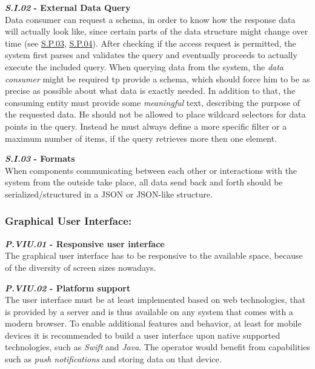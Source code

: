 \documentclass[12pt,english,a4paper,titlepage,cleardoublepage=empty,dottedtoc]{report}
\begin{document}
\textbf{\emph{\protect\hypertarget{si02}{}{S.I.02}} - External Data
Query}\\
Data consumer can request a schema, in order to know how the response
data will actually look like, since certain parts of the data structure
might change over time (see \protect\hyperlink{sp03}{S.P.03},
\protect\hyperlink{sp04}{S.P.04}). After checking if the access request
is permitted, the system first parses and validates the query and
eventually proceeds to actually execute the included query. When
querying data from the system, the \emph{data consumer} might be
required tp provide a schema, which should force him to be as precise as
possible about what data is exactly needed. In addition to that, the
consuming entity must provide some \emph{meaningful} text, describing
the purpose of the requested data. He should not be allowed to place
wildcard selectors for data points in the query. Instead he must always
define a more specific filter or a maximum number of items, if the query
retrieves more then one element.

\textbf{\emph{\protect\hypertarget{si03}{}{S.I.03}} - Formats}\\
When components communicating between each other or interactions with
the system from the outside take place, all data send back and forth
should be serialized/structured in a JSON or JSON-like structure.

\subsubsection{Graphical User
Interface:}\label{graphical-user-interface}

\textbf{\emph{\protect\hypertarget{pviu01}{}{P.VIU.01}} - Responsive
user interface}\\
The graphical user interface has to be responsive to the available
space, because of the diversity of screen sizes nowadays.

\textbf{\emph{\protect\hypertarget{pviu02}{}{P.VIU.02}} - Platform
support}\\
The user interface must be at least implemented based on web
technologies, that is provided by a server and is thus available on any
system that comes with a modern browser. To enable additional features
and behavior, at least for mobile devices it is recommended to build a
user interface upon native supported technologies, such as \emph{Swift}
and \emph{Java}. The operator would benefit from capabilities such as
\emph{push notifications} and storing data on that device.
\end{document}
